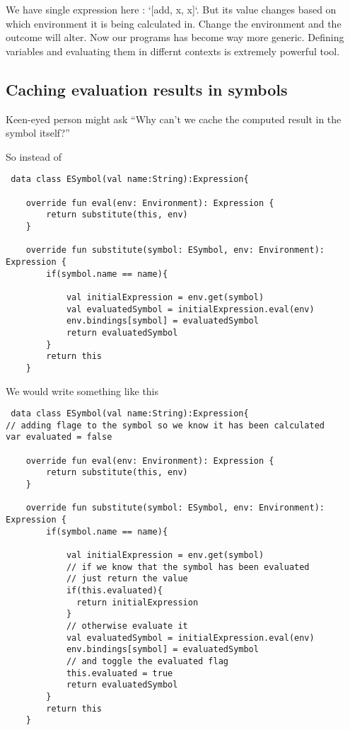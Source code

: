 \documentclass[11pt]{article}
\begin{document}
We have single expression here :  `[add, x, x]`.
But its value changes based on which environment it is being calculated in.
Change the environment and the outcome will alter.
Now our programs has become way more generic. Defining variables and evaluating them in differnt contexts is extremely powerful tool.

\subsection{Caching evaluation results in symbols}
\label{sec:org08cf49d}
Keen-eyed person might ask ``Why can't we cache the computed result in the symbol itself?''

So instead of
\begin{verbatim}
 data class ESymbol(val name:String):Expression{

    override fun eval(env: Environment): Expression {
        return substitute(this, env)
    }

    override fun substitute(symbol: ESymbol, env: Environment): Expression {
        if(symbol.name == name){

            val initialExpression = env.get(symbol)
            val evaluatedSymbol = initialExpression.eval(env)
            env.bindings[symbol] = evaluatedSymbol
            return evaluatedSymbol
        }
        return this
    }

\end{verbatim}

We would write something like this

\begin{verbatim}
 data class ESymbol(val name:String):Expression{
// adding flage to the symbol so we know it has been calculated
var evaluated = false

    override fun eval(env: Environment): Expression {
        return substitute(this, env)
    }

    override fun substitute(symbol: ESymbol, env: Environment): Expression {
        if(symbol.name == name){

            val initialExpression = env.get(symbol)
            // if we know that the symbol has been evaluated
            // just return the value
            if(this.evaluated){
              return initialExpression
            }
            // otherwise evaluate it
            val evaluatedSymbol = initialExpression.eval(env)
            env.bindings[symbol] = evaluatedSymbol
            // and toggle the evaluated flag
            this.evaluated = true
            return evaluatedSymbol
        }
        return this
    }

\end{verbatim}
\end{document}
